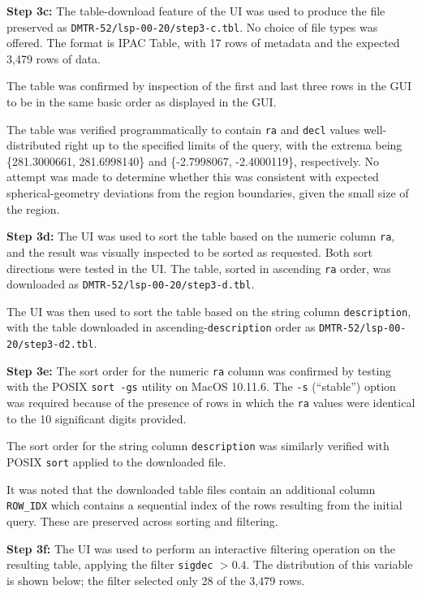 \textbf{Step 3c:} The table-download feature of the UI was used to produce the file preserved as \verb|DMTR-52/lsp-00-20/step3-c.tbl|.
No choice of file types was offered.
The format is IPAC Table, with 17 rows of metadata and the expected 3,479 rows of data.

The table was confirmed by inspection of the first and last three rows in the GUI to be in the same basic order as displayed in the GUI.

The table was verified programmatically to contain \verb|ra| and \verb|decl| values well-distributed right up to the specified limits of the query,
with the extrema being \{281.3000661, 281.6998140\} and \{-2.7998067, -2.4000119\},
respectively.
No attempt was made to determine whether this was consistent with expected spherical-geometry deviations from the region boundaries,
given the small size of the region.

\textbf{Step 3d:} The UI was used to sort the table based on the numeric column \verb|ra|,
and the result was visually inspected to be sorted as requested.
Both sort directions were tested in the UI.
The table, sorted in ascending \verb|ra| order, was downloaded as \verb|DMTR-52/lsp-00-20/step3-d.tbl|.

The UI was then used to sort the table based on the string column \verb|description|,
with the table downloaded in ascending-\verb|description| order as \verb|DMTR-52/lsp-00-20/step3-d2.tbl|.

\textbf{Step 3e:} The sort order for the numeric \verb|ra| column was confirmed by testing with the POSIX \texttt{sort -gs} utility on MacOS 10.11.6.
The \verb|-s| (``stable'') option was required because of the presence of rows in which the \verb|ra| values were identical to the 10 significant digits provided.

The sort order for the string column \verb|description| was similarly verified with POSIX \verb|sort| applied to the downloaded file.

It was noted that the downloaded table files contain an additional column \verb|ROW_IDX| which contains a sequential index of the rows resulting from the initial query.
These are preserved across sorting and filtering.

\textbf{Step 3f:} The UI was used to perform an interactive filtering operation on the resulting table,
applying the filter \verb|sigdec| $> 0.4$.
The distribution of this variable is shown below; the filter selected only 28 of the 3,479 rows.

